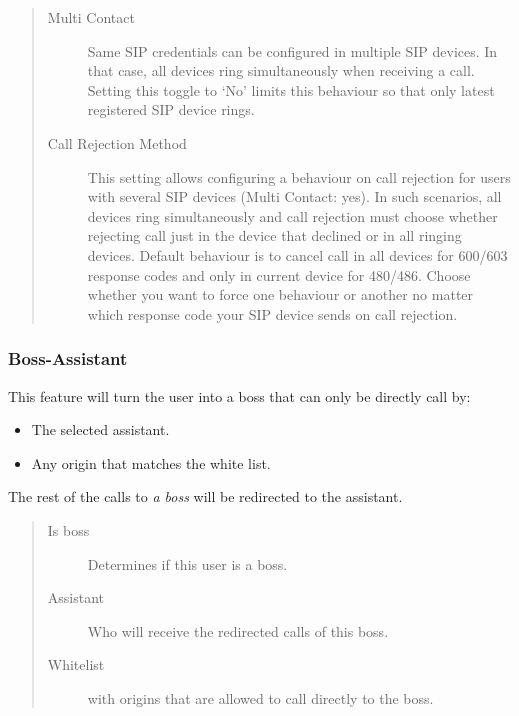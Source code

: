 \documentclass[letterpaper,10pt,spanish]{sphinxmanual}
\begin{document}
\begin{quote}
\begin{description}
\item[{Multi Contact}] \leavevmode
Same SIP credentials can be configured in multiple SIP devices. In that case, all devices ring
simultaneously when receiving a call. Setting this toggle to `No' limits this behaviour so that
only latest registered SIP device rings.

\item[{Call Rejection Method}] \leavevmode
This setting allows configuring a behaviour on call rejection for users with several
SIP devices (Multi Contact: yes). In such scenarios, all devices ring simultaneously and call rejection must
choose whether rejecting call just in the device that declined or in all ringing devices.
Default behaviour is to cancel call in all devices for 600/603 response codes and only in
current device for 480/486. Choose whether you want to force one behaviour or another no
matter which response code your SIP device sends on call rejection.

\end{description}
\end{quote}


\subsubsection{Boss-Assistant}
\label{administration_portal/client/vpbx/users:boss-assistant}
This feature will turn the user into a boss that can only be directly call by:
\begin{itemize}
\item {} 
The selected assistant.

\item {} 
Any origin that matches the white list.

\end{itemize}

The rest of the calls to \emph{a boss} will be redirected to the assistant.
\begin{quote}
\begin{description}
\item[{Is boss}] \leavevmode
Determines if this user is a boss.

\item[{Assistant}] \leavevmode
Who will receive the redirected calls of this boss.

\item[{Whitelist}] \leavevmode
{\hyperref[administration_portal/client/vpbx/routing_tools/match_lists:match\string-lists]{}} with origins that are allowed to call directly to
the boss.

\end{description}
\end{quote}
\end{document}
